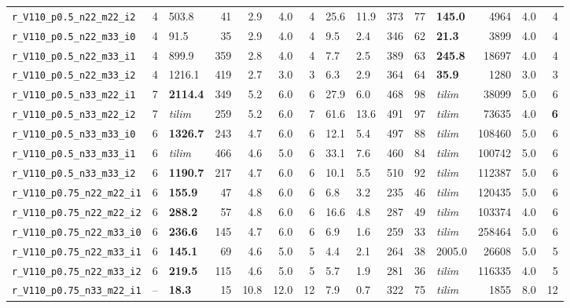 \documentclass[preprint, 11pt, authoryear]{elsarticle}
\begin{document}
\begin{table}
\begin{tabular}{lrlrrrrllrrlrlr}
\texttt{r\_V110\_p0.5\_n22\_m22\_i2} & 4 & 503.8 & 41 & 2.9 & 4.0 & 4 & 25.6 & 11.9 & 373 & 77 & \textbf{145.0} & 4964 & 4.0 & 4 \\
\texttt{r\_V110\_p0.5\_n22\_m33\_i0} & 4 & 91.5 & 35 & 2.9 & 4.0 & 4 & 9.5 & 2.4 & 346 & 62 & \textbf{21.3} & 3899 & 4.0 & 4 \\
\texttt{r\_V110\_p0.5\_n22\_m33\_i1} & 4 & 899.9 & 359 & 2.8 & 4.0 & 4 & 7.7 & 2.5 & 389 & 63 & \textbf{245.8} & 18697 & 4.0 & 4 \\
\texttt{r\_V110\_p0.5\_n22\_m33\_i2} & 4 & 1216.1 & 419 & 2.7 & 3.0 & 3 & 6.3 & 2.9 & 364 & 64 & \textbf{35.9} & 1280 & 3.0 & 3 \\
\texttt{r\_V110\_p0.5\_n33\_m22\_i1} & 7 & \textbf{2114.4} & 349 & 5.2 & 6.0 & 6 & 27.9 & 6.0 & 468 & 98 & \textit{tilim} & 38099 & 5.0 & 6 \\
\texttt{r\_V110\_p0.5\_n33\_m22\_i2} & 7 & \textit{tilim} & 259 & 5.2 & 6.0 & 7 & 61.6 & 13.6 & 491 & 97 & \textit{tilim} & 73635 & 4.0 & \textbf{6} \\
\texttt{r\_V110\_p0.5\_n33\_m33\_i0} & 6 & \textbf{1326.7} & 243 & 4.7 & 6.0 & 6 & 12.1 & 5.4 & 497 & 88 & \textit{tilim} & 108460 & 5.0 & 6 \\
\texttt{r\_V110\_p0.5\_n33\_m33\_i1} & 6 & \textit{tilim} & 466 & 4.6 & 5.0 & 6 & 33.1 & 7.6 & 460 & 84 & \textit{tilim} & 100742 & 5.0 & 6 \\
\texttt{r\_V110\_p0.5\_n33\_m33\_i2} & 6 & \textbf{1190.7} & 217 & 4.7 & 6.0 & 6 & 10.1 & 5.5 & 510 & 92 & \textit{tilim} & 112387 & 5.0 & 6 \\
\midrule
\texttt{r\_V110\_p0.75\_n22\_m22\_i1} & 6 & \textbf{155.9} & 47 & 4.8 & 6.0 & 6 & 6.8 & 3.2 & 235 & 46 & \textit{tilim} & 120435 & 5.0 & 6 \\
\texttt{r\_V110\_p0.75\_n22\_m22\_i2} & 6 & \textbf{288.2} & 57 & 4.8 & 6.0 & 6 & 16.6 & 4.8 & 287 & 49 & \textit{tilim} & 103374 & 4.0 & 6 \\
\texttt{r\_V110\_p0.75\_n22\_m33\_i0} & 6 & \textbf{236.6} & 145 & 4.7 & 6.0 & 6 & 6.9 & 1.6 & 259 & 33 & \textit{tilim} & 258464 & 5.0 & 6 \\
\texttt{r\_V110\_p0.75\_n22\_m33\_i1} & 6 & \textbf{145.1} & 69 & 4.6 & 5.0 & 5 & 4.4 & 2.1 & 264 & 38 & 2005.0 & 26608 & 5.0 & 5 \\
\texttt{r\_V110\_p0.75\_n22\_m33\_i2} & 6 & \textbf{219.5} & 115 & 4.6 & 5.0 & 5 & 5.7 & 1.9 & 281 & 36 & \textit{tilim} & 116335 & 4.0 & 5 \\
\texttt{r\_V110\_p0.75\_n33\_m22\_i1} & -- & \textbf{18.3} & 15 & 10.8 & 12.0 & 12 & 7.9 & 0.7 & 322 & 75 & \textit{tilim} & 1855 & 8.0 & 12 \\

\end{tabular}
\end{table}
\end{document}
